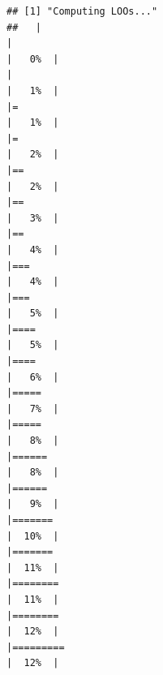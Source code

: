 \documentclass[
]{article}
\begin{document}
\begin{verbatim}
## [1] "Computing LOOs..."
##   |                                                                              |                                                                      |   0%  |                                                                              |                                                                      |   1%  |                                                                              |=                                                                     |   1%  |                                                                              |=                                                                     |   2%  |                                                                              |==                                                                    |   2%  |                                                                              |==                                                                    |   3%  |                                                                              |==                                                                    |   4%  |                                                                              |===                                                                   |   4%  |                                                                              |===                                                                   |   5%  |                                                                              |====                                                                  |   5%  |                                                                              |====                                                                  |   6%  |                                                                              |=====                                                                 |   7%  |                                                                              |=====                                                                 |   8%  |                                                                              |======                                                                |   8%  |                                                                              |======                                                                |   9%  |                                                                              |=======                                                               |  10%  |                                                                              |=======                                                               |  11%  |                                                                              |========                                                              |  11%  |                                                                              |========                                                              |  12%  |                                                                              |=========                                                             |  12%  |                                                              
\end{verbatim}
\end{document}
